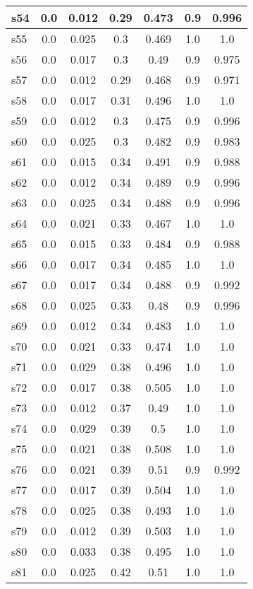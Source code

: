 \documentclass{article}
\begin{document}
\begin{tabular}{|l|c|c|c|c|c|c|}
\hline
s54 &0.0 & 0.012 & 0.29 & 0.473 & 0.9 & 0.996\\
\hline
s55 &0.0 & 0.025 & 0.3 & 0.469 & 1.0 & 1.0\\
\hline
s56 &0.0 & 0.017 & 0.3 & 0.49 & 0.9 & 0.975\\
\hline
s57 &0.0 & 0.012 & 0.29 & 0.468 & 0.9 & 0.971\\
\hline
s58 &0.0 & 0.017 & 0.31 & 0.496 & 1.0 & 1.0\\
\hline
s59 &0.0 & 0.012 & 0.3 & 0.475 & 0.9 & 0.996\\
\hline
s60 &0.0 & 0.025 & 0.3 & 0.482 & 0.9 & 0.983\\
\hline
s61 &0.0 & 0.015 & 0.34 & 0.491 & 0.9 & 0.988\\
\hline
s62 &0.0 & 0.012 & 0.34 & 0.489 & 0.9 & 0.996\\
\hline
s63 &0.0 & 0.025 & 0.34 & 0.488 & 0.9 & 0.996\\
\hline
s64 &0.0 & 0.021 & 0.33 & 0.467 & 1.0 & 1.0\\
\hline
s65 &0.0 & 0.015 & 0.33 & 0.484 & 0.9 & 0.988\\
\hline
s66 &0.0 & 0.017 & 0.34 & 0.485 & 1.0 & 1.0\\
\hline
s67 &0.0 & 0.017 & 0.34 & 0.488 & 0.9 & 0.992\\
\hline
s68 &0.0 & 0.025 & 0.33 & 0.48 & 0.9 & 0.996\\
\hline
s69 &0.0 & 0.012 & 0.34 & 0.483 & 1.0 & 1.0\\
\hline
s70 &0.0 & 0.021 & 0.33 & 0.474 & 1.0 & 1.0\\
\hline
s71 &0.0 & 0.029 & 0.38 & 0.496 & 1.0 & 1.0\\
\hline
s72 &0.0 & 0.017 & 0.38 & 0.505 & 1.0 & 1.0\\
\hline
s73 &0.0 & 0.012 & 0.37 & 0.49 & 1.0 & 1.0\\
\hline
s74 &0.0 & 0.029 & 0.39 & 0.5 & 1.0 & 1.0\\
\hline
s75 &0.0 & 0.021 & 0.38 & 0.508 & 1.0 & 1.0\\
\hline
s76 &0.0 & 0.021 & 0.39 & 0.51 & 0.9 & 0.992\\
\hline
s77 &0.0 & 0.017 & 0.39 & 0.504 & 1.0 & 1.0\\
\hline
s78 &0.0 & 0.025 & 0.38 & 0.493 & 1.0 & 1.0\\
\hline
s79 &0.0 & 0.012 & 0.39 & 0.503 & 1.0 & 1.0\\
\hline
s80 &0.0 & 0.033 & 0.38 & 0.495 & 1.0 & 1.0\\
\hline
s81 &0.0 & 0.025 & 0.42 & 0.51 & 1.0 & 1.0\\

\end{tabular}
\end{document}
